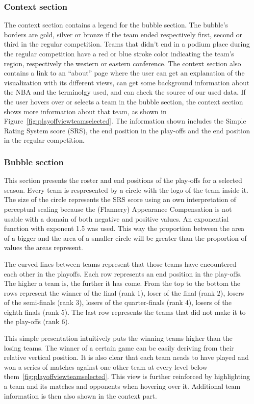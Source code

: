 \documentclass[chi_draft]{sigchi}
\begin{document}
\subsubsection{Context section}
The context section contains a legend for the bubble section. The bubble's
borders are gold, silver or bronze if the team ended respectively first, second
or third in the regular competition. Teams that didn't end in a podium place
during the regular competition have a red or blue stroke color indicating the
team's region, respectively the western or eastern conference. The context
section also contains a link to an ``about'' page where the user can get an
explanation of the visualization with its different views, can get some
background information about the NBA and the terminolgy used, and can check the
source of our used data. If the user hovers over or selects a team in the bubble
section, the context section shows more information about that team, as shown in
Figure~\ref{fig:playoffviewteamselected}. The information shown includes the
Simple Rating System score (SRS), the end position in the play-offs and the end
position in the regular competition.

\subsubsection{Bubble section}
This section presents the roster and end positions of the play-offs for a
selected season. Every team is respresented by a circle with the logo of the
team inside it. The size of the circle represents the SRS score using an own
interpretation of perceptual scaling because the (Flannery) Appearance
Compensation is not usable with a domain of both negative and positive values.
An exponential function with exponent 1.5 was used. This way the proportion
between the area of a bigger and the area of a smaller circle will be greater
than the proportion of values the areas represent.

The curved lines between teams represent that those teams have encountered each
other in the playoffs. Each row represents an end position in the play-offs. The
higher a team is, the further it has come.  From the top to the bottom the rows
represent the winner of the final (rank 1), loser of the final (rank 2), losers
of the semi-finals (rank 3), losers of the quarter-finals (rank 4), losers of
the eighth finals (rank 5). The last row represents the teams that did not make
it to the play-offs (rank 6). 

This simple presentation intuitively puts the winning teams higher than the
losing teams. The winner of a certain game can be easily deriving from their
relative vertical position. It is also clear that each team neads to have played
and won a series of matches against one other team at every level below
them~\ref{fig:playoffviewteamselected}. This view is further reinforced by
highlighting a team and its matches and opponents when hovering over it.
Additional team information is then also shown in the context part.
\end{document}
